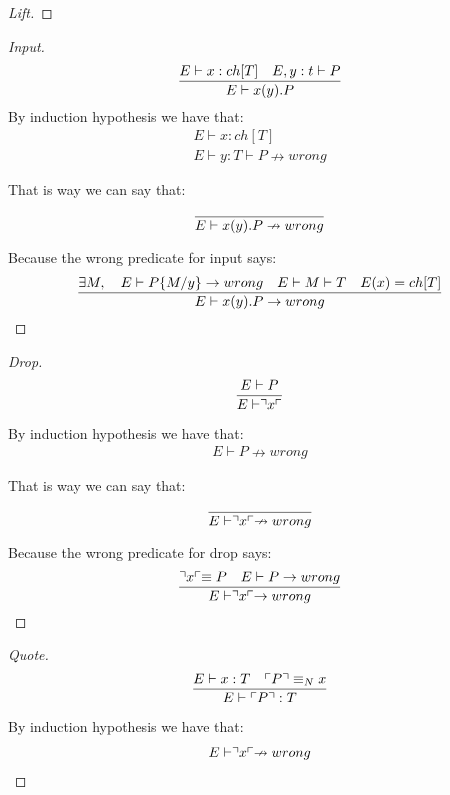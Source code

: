 \begin{theorem}
\begin{proof}[Lift]
\end{proof}

\begin{proof}[Input]
\begin{align*}
\frac{E \vdash x:ch[T] \quad E,y:t \vdash P}{E \vdash x(y).P}
\end{align*}
By induction hypothesis we have that:
\begin{align*}
E \vdash x:ch[T]\\
E \vdash y:T \vdash P \nrightarrow wrong
\end{align*}

That is way we can say that:
\begin{align*}
\frac{}{E \vdash x(y).P \nrightarrow wrong}
\end{align*}

Because the wrong predicate for input says:
\begin{align*}
\frac{\exists M, \quad E \vdash P\{M/y\}\rightarrow wrong \quad E\vdash M\vdash T \quad E(x)=ch[T]}{E \vdash x(y).P \rightarrow wrong}
\end{align*}
\end{proof}

\begin{proof}[Drop]
\begin{align*}
\frac{E \vdash P}{E \vdash \urcorner x \ulcorner}
\end{align*}

By induction hypothesis we have that:
\begin{align*}
E \vdash P \nrightarrow wrong
\end{align*}

That is way we can say that:
\begin{align*}
\frac{}{E \vdash \urcorner x \ulcorner \nrightarrow wrong}
\end{align*}

Because the wrong predicate for drop says:
\begin{align*}
\frac{\urcorner x \ulcorner \equiv P \quad E \vdash P \rightarrow wrong}{E \vdash \urcorner x \ulcorner \rightarrow wrong}
\end{align*}
\end{proof}

\begin{proof}[Quote]
\begin{align*}
\frac{E \vdash x:T \quad \ulcorner P \urcorner \equiv _N x}{E \vdash \ulcorner P \urcorner:T}
\end{align*}

By induction hypothesis we have that:
\begin{align*}
E \vdash \urcorner x \ulcorner \nrightarrow wrong
\end{align*}


\end{proof}
\end{theorem}
